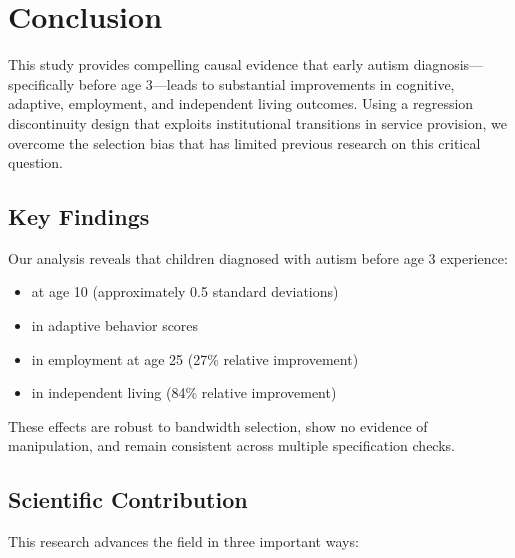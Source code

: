 \documentclass[letterpaper,10pt,english]{jupyterBook}
\begin{document}
\sphinxstepscope


\chapter{Conclusion}
\label{\detokenize{conclusion:conclusion}}\label{\detokenize{conclusion::doc}}
\sphinxAtStartPar
This study provides compelling causal evidence that early autism diagnosis—specifically before age 3—leads to substantial improvements in cognitive, adaptive, employment, and independent living outcomes. Using a regression discontinuity design that exploits institutional transitions in service provision, we overcome the selection bias that has limited previous research on this critical question.


\section{Key Findings}
\label{\detokenize{conclusion:key-findings}}
\sphinxAtStartPar
Our analysis reveals that children diagnosed with autism before age 3 experience:
\begin{itemize}
\item {} 
\sphinxAtStartPar
{} at age 10 (approximately 0.5 standard deviations)

\item {} 
\sphinxAtStartPar
{} in adaptive behavior scores

\item {} 
\sphinxAtStartPar
{} in employment at age 25 (27\% relative improvement)

\item {} 
\sphinxAtStartPar
{} in independent living (84\% relative improvement)

\end{itemize}

\sphinxAtStartPar
These effects are robust to bandwidth selection, show no evidence of manipulation, and remain consistent across multiple specification checks.


\section{Scientific Contribution}
\label{\detokenize{conclusion:scientific-contribution}}
\sphinxAtStartPar
This research advances the field in three important ways:
\end{document}
